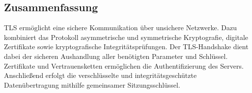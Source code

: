 \subsection{Zusammenfassung}
TLS ermöglicht eine sichere Kommunikation über unsichere Netzwerke. Dazu kombiniert das Protokoll asymmetrische und symmetrische Kryptografie, digitale Zertifikate sowie kryptografische Integritätsprüfungen.
Der TLS-Handshake dient dabei der sicheren Aushandlung aller benötigten Parameter und Schlüssel. Zertifikate und Vertrauensketten ermöglichen die Authentifizierung des Servers. Anschließend erfolgt die verschlüsselte und integritätsgeschützte Datenübertragung mithilfe gemeinsamer Sitzungsschlüssel.
